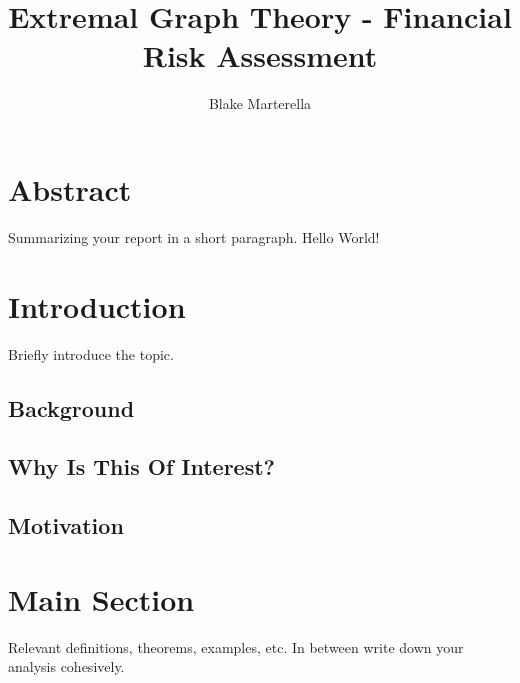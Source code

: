 \documentclass{article}
\begin{document}
\title{Extremal Graph Theory - Financial Risk Assessment}
\author{Blake Marterella}
\date{}

\maketitle

\section*{Abstract}
    Summarizing your report in a short paragraph.
    Hello World!

\tableofcontents

\section{Introduction}

Briefly introduce the topic.

\subsection{Background}

\subsection{Why Is This Of Interest?}

\subsection{Motivation}

\section{Main Section}

Relevant definitions, theorems, examples, etc. In between write down your analysis cohesively.
\end{document}
